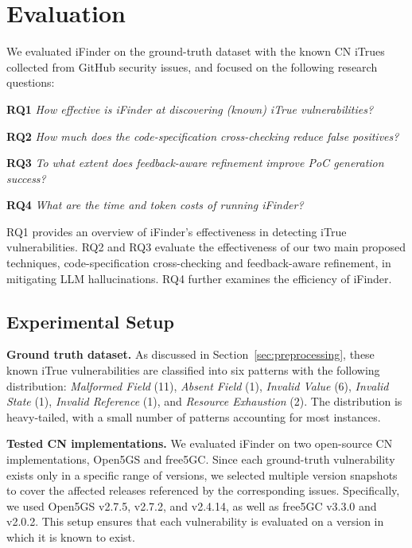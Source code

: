 \section{Evaluation}
\label{sec:evaluation}
We evaluated iFinder on the ground-truth dataset with the known CN iTrues collected from GitHub security issues, and focused on the following research questions:

\noindent\textbf{RQ1} \textit{How effective is iFinder at discovering (known) iTrue vulnerabilities?}

\noindent\textbf{RQ2} \textit{How much does the code-specification cross-checking reduce false positives?}

\noindent\textbf{RQ3} \textit{To what extent does feedback-aware refinement improve PoC generation success?}

\noindent\textbf{RQ4} \textit{What are the time and token costs of running iFinder?}


RQ1 provides an overview of iFinder's effectiveness in detecting iTrue vulnerabilities. RQ2 and RQ3 evaluate the effectiveness of our two main proposed techniques, code-specification cross-checking and feedback-aware refinement, in mitigating LLM hallucinations. RQ4 further examines the efficiency of iFinder.


\subsection{Experimental Setup}


\noindent\textbf{Ground truth dataset.}
As discussed in Section~\ref{sec:preprocessing}, these known iTrue vulnerabilities are classified into six patterns with the following distribution: \textit{Malformed Field} (11), \textit{Absent Field} (1), \textit{Invalid Value} (6), \textit{Invalid State} (1), \textit{Invalid Reference} (1), and \textit{Resource Exhaustion} (2). The distribution is heavy-tailed, with a small number of patterns accounting for most instances.


\noindent\textbf{Tested CN implementations.}
We evaluated iFinder on two open-source CN implementations, Open5GS and free5GC. Since each ground-truth vulnerability exists only in a specific range of versions, we selected multiple version snapshots to cover the affected releases referenced by the corresponding issues. Specifically, we used Open5GS v2.7.5, v2.7.2, and v2.4.14, as well as free5GC v3.3.0 and v2.0.2. This setup ensures that each vulnerability is evaluated on a version in which it is known to exist. 

